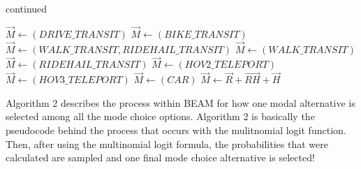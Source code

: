 \documentclass[12pt, oneside, openright]{byuthesis}
\begin{document}
\addtocounter{algorithm}{-1}
\begin{algorithm}
\caption{continued}
\begin{algorithmic} [1]
      \State $\vec{M} \gets (DRIVE\_TRANSIT)$
    \Else
      \State $\vec{M} \gets (BIKE\_TRANSIT)$
    \EndIf  
  \Else
    \State $\vec{M} \gets (WALK\_TRANSIT, RIDEHAIL\_TRANSIT)$
  \EndIf
{}  
    \State $\vec{M} \gets (WALK\_TRANSIT)$
  \Else
    \State $\vec{M} \gets (RIDEHAIL\_TRANSIT)$
  \EndIf
{}  
    \State $\vec{M} \gets (HOV2\_TELEPORT)$
  \Else
    \State $\vec{M} \gets (HOV3\_TELEPORT)$
  \EndIf
{}
  \State $\vec{M} \gets (CAR)$
\Else
  \State $\vec{M} \gets \vec{R} + \vec{RH} + \vec{H}$  
\EndIf  
\EndProcedure
\EndFor
\EndFor
\Statex
\end{algorithmic}
\end{algorithm}

Algorithm 2 describes the process within BEAM for how one modal alternative is selected among all the mode choice options. Algorithm 2 is basically the pseudocode behind the process that occurs with the mulitnomial logit function. Then, after using the multinomial logit formula, the probabilities that were calculated are sampled and one final mode choice alternative is selected!
\end{document}
